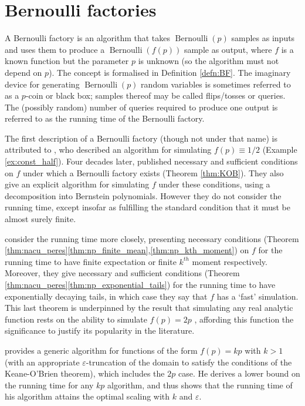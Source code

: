 \documentclass{article}
\theoremstyle{definition}
\newcommand{\Bern}{\operatorname{Bernoulli}}
\begin{document}
\section{Bernoulli factories}\label{sec:BFs}
A Bernoulli factory is an algorithm that takes $\Bern(p)$ samples as inputs and uses them to produce a $\Bern(f(p))$ sample as output, where $f$ is a known function but the parameter $p$ is unknown (so the algorithm must not depend on $p$). The concept is formalised in Definition \ref{defn:BF}.
The imaginary device for generating $\Bern(p)$ random variables is sometimes referred to as a $p$-coin or black box; samples thereof may be called flips/tosses or queries.
The (possibly random) number of queries required to produce one output is referred to as the running time of the Bernoulli factory.

The first description of a Bernoulli factory (though not under that name) is attributed to \citet{vonneumann1951}, who described an algorithm for simulating $f(p)\equiv 1/2$ (Example \ref{ex:const_half}).
Four decades later, \citet{keane1994} published necessary and sufficient conditions on $f$ under which a Bernoulli factory exists (Theorem \ref{thm:KOB}). They also give an explicit algorithm for simulating $f$ under these conditions, using a decomposition into Bernstein polynomials. However they do not consider the running time, except insofar as fulfilling the standard condition that it must be almost surely finite.

\citet{nacu2005} consider the running time more closely, presenting necessary conditions (Theorem \ref{thm:nacu_peres}\ref{thm:np_finite_mean},\ref{thm:np_kth_moment}) on $f$ for the running time to have finite expectation or finite $k^{th}$ moment respectively. Moreover, they give necessary and sufficient conditions (Theorem \ref{thm:nacu_peres}\ref{thm:np_exponential_tails}) for the running time to have exponentially decaying tails, in which case they say that $f$ has a `fast' simulation.
This last theorem is underpinned by the result that simulating any real analytic function rests on the ability to simulate $f(p)=2p$ \citep[Proposition 14(iii)]{nacu2005}, affording this function the significance to justify its popularity in the literature.

\citet{huber2016} provides a generic algorithm for functions of the form $f(p)=kp$ with $k>1$ (with an appropriate $\varepsilon$-truncation of the domain to satisfy the conditions of the Keane-O'Brien theorem), which includes the $2p$ case. He derives a lower bound on the running time for any $kp$ algorithm, and thus shows that the running time of his algorithm attains the optimal scaling with $k$ and $\varepsilon$.
\end{document}
